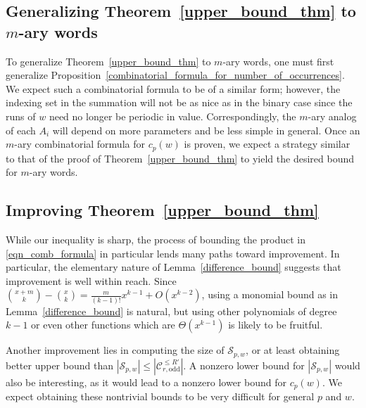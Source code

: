 \documentclass[11pt]{amsart}
\newtheorem{conj}{Conjecture}
\newcommand{\ZZ}{\mathbb{Z}}
\begin{document}

\subsection{Generalizing Theorem~\ref{upper_bound_thm} to $m$-ary words}\label{m_ary_bound}

To generalize Theorem~\ref{upper_bound_thm} to $m$-ary words, one must first generalize Proposition~\ref{combinatorial_formula_for_number_of_occurrences}. We expect such a combinatorial formula to be of a similar form; however, the indexing set in the summation will not be as nice as in the binary case since the runs of $w$ need no longer be periodic in value. Correspondingly, the $m$-ary analog of each $A_i$ will depend on more parameters and be less simple in general. Once an $m$-ary combinatorial formula for $c_p(w)$ is proven, we expect a strategy similar to that of the proof of Theorem~\ref{upper_bound_thm} to yield the desired bound for $m$-ary words.

\subsection{Improving Theorem~\ref{upper_bound_thm}}\label{improving_upper_bound}

While our inequality is sharp, the process of bounding the product in \eqref{eqn_comb_formula} in particular lends many paths toward improvement. In particular, the elementary nature of Lemma~\ref{difference_bound} suggests that improvement is well within reach. Since ${x+m\choose k}-{x\choose k}=\frac{m}{(k-1)!}x^{k-1}+O(x^{k-2})$, using a monomial bound as in Lemma~\ref{difference_bound} is natural, but using other polynomials of degree $k-1$ or even other functions which are $\Theta(x^{k-1})$ is likely to be fruitful.

Another improvement lies in computing the size of $\mathcal{S}_{p,w}$, or at least obtaining better upper bound than $|\mathcal{S}_{p,w}|\leq |\mathscr{C}_{r,\text{odd}}^{\leq R'}|$. A nonzero lower bound for $|\mathcal{S}_{p,w}|$ would also be interesting, as it would lead to a nonzero lower bound for $c_p(w)$. We expect obtaining these nontrivial bounds to be very difficult for general $p$ and $w$.
\end{document}
